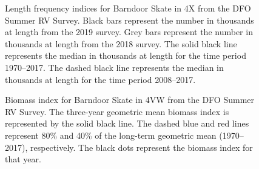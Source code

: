 \documentclass[11pt]{book}
\begin{document}
\begin{figure}[htb]

{\centering {} 

}

\caption{Length frequency indices for Barndoor Skate in 4X from the DFO Summer RV Survey. Black bars represent the number in thousands at length from the 2019 survey. Grey bars represent the number in thousands at length from the 2018 survey. The solid black line represents the median in thousands at length for the time period 1970--2017. The dashed black line represents the median in thousands at length for the time period 2008--2017.}\label{fig:82-fig-barndoorskate-lengthfreq4X}
\end{figure}

\begin{figure}[htb]

{\centering {} 

}

\caption{Biomass index for Barndoor Skate in 4VW from the DFO Summer RV Survey. The three-year geometric mean biomass index is represented by the solid black line. The dashed blue and red lines represent 80\% and 40\% of the long-term geometric mean (1970--2017), respectively. The black dots represent the biomass index for that year.}\label{fig:83-fig-barndoorskate-biomass4VW}
\end{figure}
\end{document}
